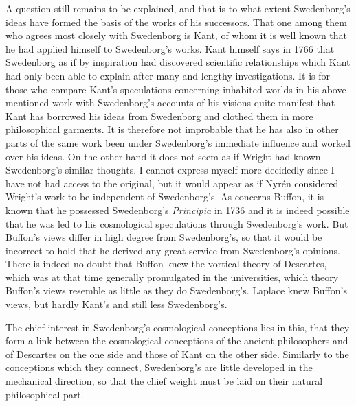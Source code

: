 \documentclass[a4paper, 11pt, oneside, polutonikogreek, english]{article}
\begin{document}
A question still remains to be explained, and that is to what extent Swedenborg's ideas have formed the basis of the works of his successors. That one among them who agrees most closely with Swedenborg is Kant, of whom it is well known that he had applied himself to Swedenborg's works. Kant himself says in 1766 that Swedenborg as if by inspiration had discovered scientific relationships which Kant had only been able to explain after many and lengthy investigations. It is for those who compare Kant's speculations concerning inhabited worlds in his above mentioned work with Swedenborg's accounts of his visions quite manifest that Kant has borrowed his ideas from Swedenborg and clothed them in more philosophical garments. It is therefore not improbable that he has also in other parts of the same work been under Swedenborg's immediate influence and worked over his ideas. On the other hand it does not seem as if Wright had known Swedenborg's similar thoughts. I cannot express myself more decidedly since I have not had access to the original, but it would appear as if Nyrén considered Wright's work to be independent of Swedenborg's. As concerns Buffon, it is known that he possessed Swedenborg's \emph{Principia} in 1736 and it is indeed possible that he was led to his cosmological speculations through Swedenborg's work. But Buffon's views differ in high degree from Swedenborg's, so that it would be incorrect to hold that he derived any great service from Swedenborg's opinions. There is indeed no doubt that Buffon knew the vortical theory of Descartes, which was at that time generally promulgated in the universities, which theory Buffon's views resemble as little as they do Swedenborg's. Laplace knew Buffon's views, but hardly Kant's and still less Swedenborg's.

The chief interest in Swedenborg's cosmological conceptions lies in this, that they form a link between the cosmological conceptions of the ancient philosophers and of Descartes on the one side and those of Kant on the other side. Similarly to the conceptions which they connect, Swedenborg's are little developed in the mechanical direction, so that the chief weight must be laid on their natural philosophical part.
\end{document}
